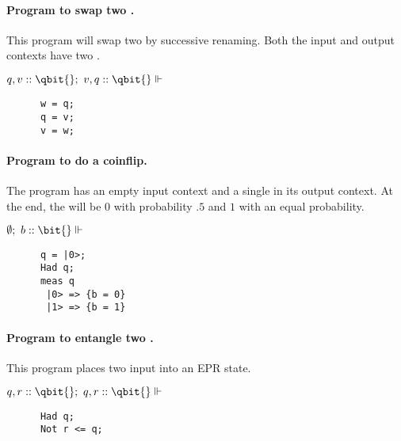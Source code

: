 \paragraph{Program to swap two \qbits.}
This program will swap two \qbits{} by successive renaming. Both the
input and output contexts have two \qbits.

$q,v::\qbit{} ;\ v,q::\qbit{} \ientail$
\begin{Verbatim}
      w = q;
      q = v;
      v = w;
\end{Verbatim}


\paragraph{Program to do a coinflip.}
The program has an empty input context and a single \bit{} in its 
output context. At the end, the \bit{}  will be $0$ with
probability $.5$ and $1$ with an equal probability.


$\emptyset ;\ b::\bit{} \ientail$
\begin{Verbatim}
      q = |0>;
      Had q;
      meas q
       |0> => {b = 0}
       |1> => {b = 1}
\end{Verbatim}


\paragraph{Program to entangle two \qbits{}.} This program places
two input \qbits{} into an EPR state.


$q, r::\qbit{} ;\  q, r::\qbit{}  \ientail$
\begin{Verbatim}
      Had q;
      Not r <= q;
\end{Verbatim}



